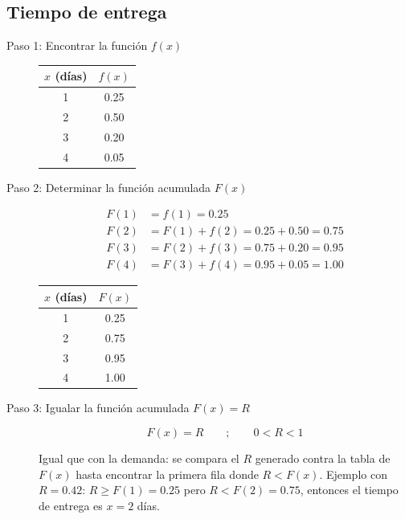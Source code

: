 \documentclass[12pt]{article}
\begin{document}
\subsection{Tiempo de entrega}

\begin{description}
    \item[Paso 1: Encontrar la función $f(x)$]
    

    \begin{center}
    \begin{tabular}{cc}
    \toprule
    $x$ (días) & $f(x)$ \\
    \midrule
    1 & 0.25 \\
    2 & 0.50 \\
    3 & 0.20 \\
    4 & 0.05 \\
    \bottomrule
    \end{tabular}
    \end{center}

    \item[Paso 2: Determinar la función acumulada $F(x)$]

    \begin{align*}
    F(1) &= f(1) = 0.25 \\
    F(2) &= F(1) + f(2) = 0.25 + 0.50 = 0.75 \\
    F(3) &= F(2) + f(3) = 0.75 + 0.20 = 0.95 \\
    F(4) &= F(3) + f(4) = 0.95 + 0.05 = 1.00
    \end{align*}

    \begin{center}
    \begin{tabular}{cc}
    \toprule
    $x$ (días) & $F(x)$ \\
    \midrule
    1 & 0.25 \\
    2 & 0.75 \\
    3 & 0.95 \\
    4 & 1.00 \\
    \bottomrule
    \end{tabular}
    \end{center}

    \item[Paso 3: Igualar la función acumulada $F(x) = R$]

    $$ F(x)=R \qquad ; \qquad 0 < R < 1 $$

    Igual que con la demanda: se compara el $R$ generado contra la tabla de $F(x)$ hasta encontrar la primera fila donde $R < F(x)$. Ejemplo con $R=0.42$: $R \geq F(1)=0.25$ pero $R < F(2)=0.75$, entonces el tiempo de entrega es $x=2$ días.


\end{description}
\end{document}
